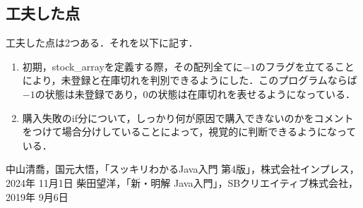 \documentclass{jlreq}
\begin{document}
  \subsection{工夫した点}
  工夫した点は2つある．それを以下に記す．
  \begin{enumerate}[(1). ]
    \item 初期，stock\_arrayを定義する際，その配列全てに$-1$のフラグを立てることにより，未登録と在庫切れを判別できるようにした．このプログラムならば$-1$の状態は未登録であり，$0$の状態は在庫切れを表せるようになっている．
    \item 購入失敗のif分について，しっかり何が原因で購入できないのかをコメントをつけて場合分けしていることによって，視覚的に判断できるようになっている．
  \end{enumerate}
	\begin{thebibliography}{99}
     中山清喬，国元大悟，「スッキリわかるJava入門 第4版」，株式会社インプレス，2024年 11月1日
     柴田望洋，「新・明解 Java入門」，SBクリエイティブ株式会社，2019年 9月6日
	\end{thebibliography}
\end{document}
